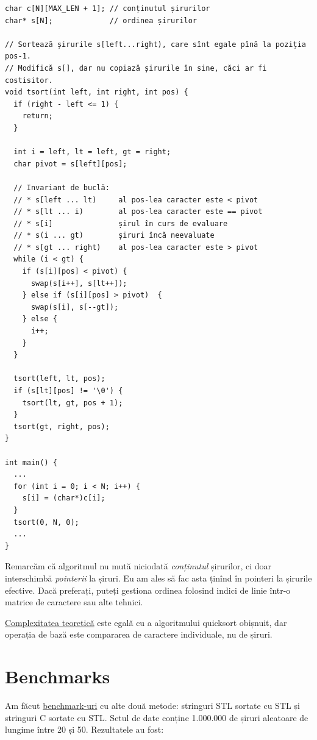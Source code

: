 \documentclass[../main.tex]{subfiles}
\begin{document}
\begin{verbatim}
char c[N][MAX_LEN + 1]; // conținutul șirurilor
char* s[N];             // ordinea șirurilor

// Sortează șirurile s[left...right), care sînt egale pînă la poziția pos-1.
// Modifică s[], dar nu copiază șirurile în sine, căci ar fi costisitor.
void tsort(int left, int right, int pos) {
  if (right - left <= 1) {
    return;
  }

  int i = left, lt = left, gt = right;
  char pivot = s[left][pos];

  // Invariant de buclă:
  // * s[left ... lt)     al pos-lea caracter este < pivot
  // * s[lt ... i)        al pos-lea caracter este == pivot
  // * s[i]               șirul în curs de evaluare
  // * s(i ... gt)        șiruri încă neevaluate
  // * s[gt ... right)    al pos-lea caracter este > pivot
  while (i < gt) {
    if (s[i][pos] < pivot) {
      swap(s[i++], s[lt++]);
    } else if (s[i][pos] > pivot)  {
      swap(s[i], s[--gt]);
    } else {
      i++;
    }
  }

  tsort(left, lt, pos);
  if (s[lt][pos] != '\0') {
    tsort(lt, gt, pos + 1);
  }
  tsort(gt, right, pos);
}

int main() {
  ...
  for (int i = 0; i < N; i++) {
    s[i] = (char*)c[i];
  }
  tsort(0, N, 0);
  ...
}
\end{verbatim}

Remarcăm că algoritmul nu mută niciodată \textit{conținutul} șirurilor, ci doar interschimbă \textit{pointerii} la șiruri. Eu am ales să fac asta ținînd în  pointeri la șirurile efective. Dacă preferați, puteți gestiona ordinea folosind indici de linie într-o matrice de caractere sau alte tehnici.

\href{https://algs4.cs.princeton.edu/lectures/keynote/51StringSorts.pdf#page=49}{Complexitatea  teoretică} este egală cu a algoritmului quicksort obișnuit, dar operația de bază este compararea de caractere individuale, nu de șiruri.

\section{Benchmarks}

Am făcut \href{https://github.com/CatalinFrancu/nerdvana/blob/main/strings/ternary-qsort/benchmark.cpp}{benchmark-uri} cu alte două metode: stringuri STL sortate cu STL și stringuri C sortate cu STL. Setul de date conține 1.000.000 de șiruri aleatoare de lungime între 20 și 50. Rezultatele au fost:
\end{document}

